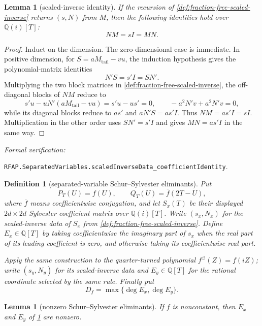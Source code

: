 \documentclass[11pt]{article}
\newtheorem{lemma}[theorem]{Lemma}
\newtheorem{definition}[theorem]{Definition}
\newcommand{\Qi}{\mathbb{Q}(i)}
\newcommand{\Q}{\mathbb{Q}}
\newcommand{\leanref}[1]{\par\smallskip\noindent
  \emph{Formal verification:}\par\nobreak
  {\raggedright\nolinkurl{#1}.\par}}
\begin{document}
\begin{lemma}[scaled-inverse identity]
\label{lem:scaled-inverse-identity}
If the recursion of \cref{def:fraction-free-scaled-inverse} returns $(s,N)$
from $M$, then the following identities hold over $\Qi[T]$:
\[
                         NM=sI=MN.
\]
\end{lemma}

\begin{proof}
Induct on the dimension.  The zero-dimensional case is immediate.  In
positive dimension, for $S=aM_{\mathrm{tail}}-vu$, the induction hypothesis
gives the polynomial-matrix identities
\[
                 N'S=s'I=SN'.
\]
Multiplying the two block matrices in
\cref{def:fraction-free-scaled-inverse}, the off-diagonal blocks of $NM$
reduce to
\[
 s'u-uN'(aM_{\mathrm{tail}}-vu)=s'u-us'=0,
 \qquad -a^2N'v+a^2N'v=0,
\]
while its diagonal blocks reduce to $as'$ and $aN'S=as'I$.
Thus $NM=as'I=sI$.  Multiplication in the other order uses $SN'=s'I$ and
gives $MN=as'I$ in the same way.
\end{proof}

\leanref{RFAP.SeparatedVariables.scaledInverseData_coefficientIdentity}

\begin{definition}[separated-variable Schur--Sylvester eliminants]
\label{def:axis-eliminants}
Put
\[
       P_T(U)=f(U),\qquad Q_T(U)=\overline f(2T-U),
\]
where $\overline f$ means coefficientwise conjugation, and let $S_x(T)$ be
their displayed $2d\times2d$ Sylvester coefficient matrix over $\Qi[T]$.
Write $(s_x,N_x)$ for the scaled-inverse data of $S_x$ from
\cref{def:fraction-free-scaled-inverse}.  Define $E_x\in\Q[T]$ by taking
coefficientwise the imaginary part of $s_x$ when the real part of its
leading coefficient is zero, and otherwise taking its coefficientwise real
part.

Apply the same construction to the quarter-turned polynomial
$f^{\circlearrowleft}(Z)=f(iZ)$; write $(s_y,N_y)$ for its scaled-inverse
data and $E_y\in\Q[T]$ for the rational coordinate selected by the same
rule.  Finally put
\[
             D_f=\max\{\deg E_x,\deg E_y\}.
\]
\end{definition}

\begin{lemma}[nonzero Schur--Sylvester eliminants]
\label{lem:eliminant-nonzero}
If $f$ is nonconstant, then $E_x$ and $E_y$ of
\cref{def:axis-eliminants} are nonzero.
\end{lemma}
\end{document}
